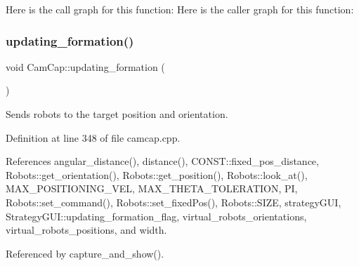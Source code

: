 Here is the call graph for this function\+:
Here is the caller graph for this function\+:
\mbox{\label{class_cam_cap_a8bab2cf2a40f386ab20480cfc83ac77c}} 
\subsubsection{\texorpdfstring{updating\+\_\+formation()}{updating\_formation()}}
{\footnotesize\ttfamily void Cam\+Cap\+::updating\+\_\+formation (\begin{DoxyParamCaption}{ }\end{DoxyParamCaption})}



Sends robots to the target position and orientation. 



Definition at line 348 of file camcap.\+cpp.



References angular\+\_\+distance(), distance(), C\+O\+N\+S\+T\+::fixed\+\_\+pos\+\_\+distance, Robots\+::get\+\_\+orientation(), Robots\+::get\+\_\+position(), Robots\+::look\+\_\+at(), M\+A\+X\+\_\+\+P\+O\+S\+I\+T\+I\+O\+N\+I\+N\+G\+\_\+\+V\+EL, M\+A\+X\+\_\+\+T\+H\+E\+T\+A\+\_\+\+T\+O\+L\+E\+R\+A\+T\+I\+ON, PI, Robots\+::set\+\_\+command(), Robots\+::set\+\_\+fixed\+Pos(), Robots\+::\+S\+I\+ZE, strategy\+G\+UI, Strategy\+G\+U\+I\+::updating\+\_\+formation\+\_\+flag, virtual\+\_\+robots\+\_\+orientations, virtual\+\_\+robots\+\_\+positions, and width.



Referenced by capture\+\_\+and\+\_\+show().


